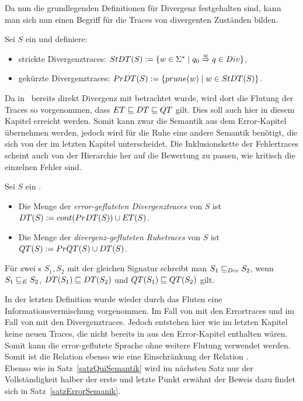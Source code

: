 Da nun die grundlegenden Definitionen für Divergenz festgehalten sind,
kann man sich nun einen Begriff für die Traces von divergenten Zuständen
bilden.\\

\begin{Def}[Divergenztraces]
  Sei $S$ ein \EIO{} und definiere:
  \begin{itemize}
    \item strickte Divergenztraces: $StDT{}(S) := \{w\in\Sigma ^*\mid q_0
      \overset{w}{\Rightarrow} q\in Div\}$,
    \item gekürzte Divergenztraces: $PrDT{}(S) := \{prune (w)\mid
      w\in StDT{}(S)\}$.
  \end{itemize}
\end{Def}

Da in~\cite{Chilton2013} bereits direkt Divergenz mit betrachtet wurde, wird
dort die Flutung der Traces so vorgenommen, dass $ET\sqsubseteq DT\sqsubseteq
QT$ gilt. Dies soll auch hier in diesem Kapitel erreicht werden. Somit kann
zwar die Semantik aus dem Error-Kapitel übernehmen werden, jedoch wird für die
Ruhe eine andere Semantik benötigt, die sich von der im letzten Kapitel
unterscheidet. Die Inklusionskette der Fehlertraces scheint auch von der
Hierarchie her auf die Bewertung zu passen, wie kritisch die einzelnen Fehler
sind.

\begin{Def}
  \label{DefRuheDivSemantik}
  Sei $S$ ein \EIO{}.
  \begin{itemize}
    \item Die Menge der \emph{error-gefluteten Divergenztraces} von $S$ ist
      $DT{}(S) := cont{}(PrDT{}(S))\cup ET{}(S)$.
    \item Die Menge der \emph{divergenz-gefluteten Ruhetraces} von $S$ ist
      $QT{}(S) := PrQT{}(S)\cup DT{}(S)$.
  \end{itemize}
  Für zwei \EIO{}s $S_1, S_2$ mit der gleichen Signatur schreibt man $S_1\sqsubseteq _{Div}
  S_2$, wenn $S_1\sqsubseteq _E S_2$, $DT{}(S_1)\sqsubseteq DT{}(S_2)$ und
  $QT{}(S_1)\sqsubseteq QT{}(S_2)$ gilt.
\end{Def}

In der letzten Definition wurde wieder durch das Fluten eine
Informationsvermischung vorgenommen. Im Fall von \DT{} mit den Errortraces und
im Fall von \QT{} mit den Divergenztraces. Jedoch entstehen hier wie im letzten
Kapitel keine neuen Traces, die nicht bereits in \EL{} aus den Error-Kapitel
enthalten wären. Somit kann die error-geflutete Sprache ohne weitere
Flutung verwendet werden. Somit ist die Relation \DRel{} ebenso wie \QRel{}
eine Einschränkung der Relation \ERel{}.\\
Ebenso wie in Satz~\ref{satzQuiSemantik} wird im nächsten Satz nur der
Vollständigkeit halber der erste und letzte Punkt erwähnt der Beweis dazu
findet sich in Satz~\ref{satzErrorSemanik}.

